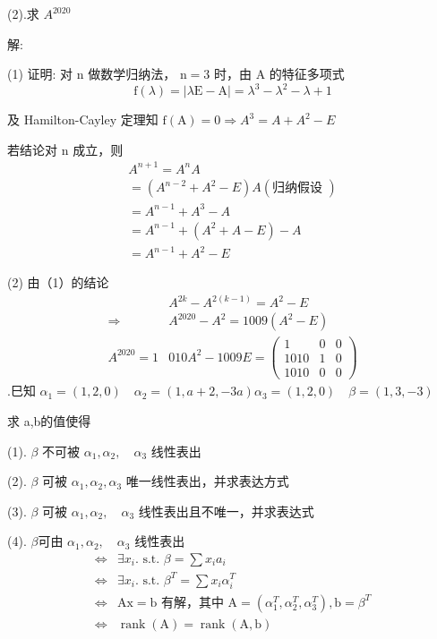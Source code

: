 \documentclass{article}
\begin{document}
(2).求 $A^{2020}$

解:

(1) 证明: 对 $\mathrm{n}$ 做数学归纳法， $\mathrm{n}=3$ 时，由 $\mathrm{A}$ 的特征多项式
$$\mathrm{f}(\lambda)=|\lambda \mathrm{E}-\mathrm{A}|=\lambda^{3}-\lambda^{2}-\lambda+1$$

及 Hamilton-Cayley 定理知 $\mathrm{f}(\mathrm{A})=0 \Rightarrow A^{3}=A+A^{2}-E$

若结论对 $\mathrm{n}$ 成立，则
$$
    \begin{array}{c}
        A^{n+1}=A^{n} A                                    \\
        =\left(A^{n-2}+A^{2}-E\right) A(\text {归纳假设 }) \\
        =A^{n-1}+A^{3}-A                                   \\
        =A^{n-1}+\left(A^{2}+A-E\right)-A                  \\
        =A^{n-1}+A^{2}-E
    \end{array}
$$

(2) 由（1）的结论
$$
    \begin{array}{rl}
                    & A^{2 k}-A^{2(k-1)}=A^{2}-E                                \\
        \Rightarrow & A^{2020}-A^{2}=1009\left(A^{2}-E\right)                   \\
        A^{2020}=1  & 010 A^{2}-1009 E=\left(\begin{array}{ccc}
                1    & 0 & 0 \\
                1010 & 1 & 0 \\
                1010 & 0 & 0
            \end{array}\right)
    \end{array}
$$
\vspace{1ex}
{.}巳知
$\alpha_{1}=(1,2,0) \quad \alpha_{2}=(1, a+2,-3 a) \alpha_{3}=(1,2,0) \quad \beta=(1,3,-3)$

求 a,b的值使得

(1). $\beta$ 不可被 $\alpha_{1}, \alpha_{2}, \quad \alpha_{3}$ 线性表出

(2). $\beta$ 可被 $\alpha_{1}, \alpha_{2}, \alpha_{3}$ 唯一线性表出，并求表达方式

(3). $\beta$ 可被 $\alpha_{1}, \alpha_{2}, \quad \alpha_{3}$ 线性表出且不唯一，并求表达式

(4). $\beta $可由 $\alpha_{1}, \alpha_{2}, \quad \alpha_{3}$ 线性表出 
$$
    \begin{aligned}
        \Leftrightarrow &\exists x_{i} . \text { s.t. } \beta=\sum x_{i} a_{i} \\
        \Leftrightarrow &\exists x_{i} . \text { s.t. } \beta^{T}=\sum x_{i} \alpha_{i}^{T} \\
        \Leftrightarrow &\mathrm{Ax}=\mathrm{b} \text { 有解，其中 } \mathrm{A}=\left(\alpha_{1}^{T}, \alpha_{2}^{T}, \alpha_{3}^{T}\right), \mathrm{b}=\beta^{T} \\
        \Leftrightarrow &\operatorname{rank}(\mathrm{A})=\operatorname{rank}(\mathrm{A}, \mathrm{b})
    \end{aligned}
$$
\end{document}
